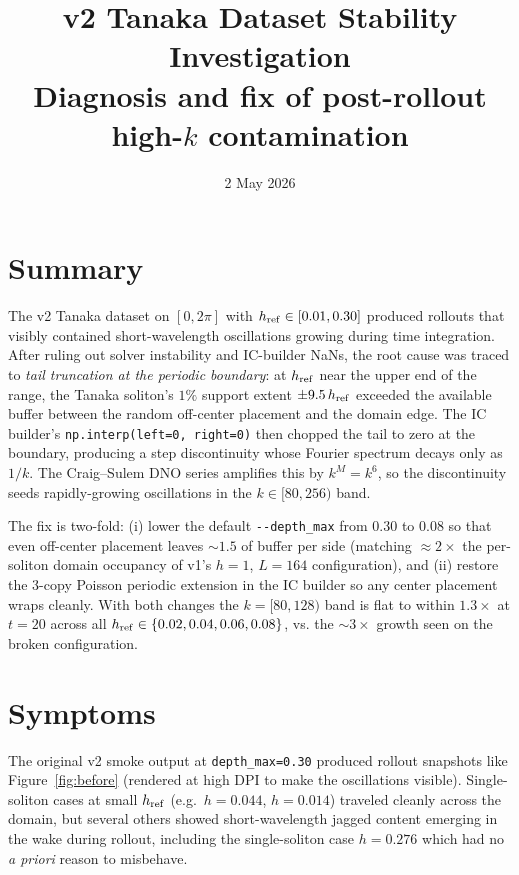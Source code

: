 \documentclass[11pt]{article}
\title{v2 Tanaka Dataset Stability Investigation\\
\large Diagnosis and fix of post-rollout high-$k$ contamination}
\author{}
\date{2 May 2026}
\begin{document}
\maketitle

\section*{Summary}

The v2 Tanaka dataset on $[0, 2\pi]$ with $h_{\rm ref} \in [0.01, 0.30]$ produced
rollouts that visibly contained short-wavelength oscillations growing during
time integration. After ruling out solver instability and IC-builder NaNs, the
root cause was traced to \emph{tail truncation at the periodic boundary}: at
$h_{\rm ref}$ near the upper end of the range, the Tanaka soliton's $1\%$
support extent $\pm 9.5\,h_{\rm ref}$ exceeded the available buffer between
the random off-center placement and the domain edge. The IC builder's
\verb|np.interp(left=0, right=0)| then chopped the tail to zero at the boundary,
producing a step discontinuity whose Fourier spectrum decays only as $1/k$.
The Craig--Sulem DNO series amplifies this by $k^M = k^6$, so the discontinuity
seeds rapidly-growing oscillations in the $k \in [80, 256)$ band.

The fix is two-fold: (i) lower the default \verb|--depth_max| from $0.30$ to
$0.08$ so that even off-center placement leaves $\sim 1.5$ of buffer per side
(matching $\approx 2\times$ the per-soliton domain occupancy of v1's $h=1$,
$L=164$ configuration), and (ii) restore the 3-copy Poisson periodic extension
in the IC builder so any center placement wraps cleanly. With both changes the
$k=[80,128)$ band is flat to within $1.3\times$ at $t=20$ across all
$h_{\rm ref} \in \{0.02, 0.04, 0.06, 0.08\}$, vs. the $\sim 3\times$ growth
seen on the broken configuration.

\section{Symptoms}

The original v2 smoke output at \verb|depth_max=0.30| produced rollout
snapshots like Figure~\ref{fig:before} (rendered at high DPI to make the
oscillations visible). Single-soliton cases at small $h_{\rm ref}$ (e.g.\ $h{=}0.044$,
$h{=}0.014$) traveled cleanly across the domain, but several others showed
short-wavelength jagged content emerging in the wake during rollout, including
the single-soliton case $h{=}0.276$ which had no \emph{a priori} reason
to misbehave.
\end{document}
